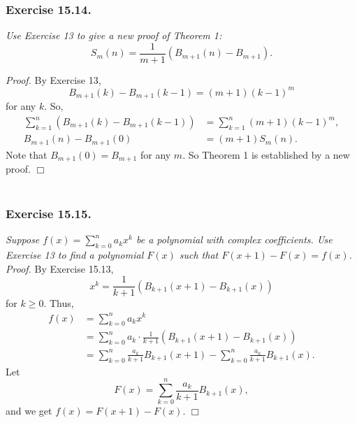\documentclass{article}
\begin{document}



\subsubsection*{Exercise 15.14.}
\emph{Use Exercise 13 to give a new proof of Theorem 1:
$$S_m(n) = \frac{1}{m+1}(B_{m+1}(n) - B_{m+1}).$$}

\emph{Proof.}
By Exercise 13,
$$B_{m+1}(k) - B_{m+1}(k-1) = (m+1)(k-1)^m$$
for any $k$.
So,
\begin{align*}
\sum_{k=1}^{n} (B_{m+1}(k) - B_{m+1}(k-1))
&= \sum_{k=1}^{n} (m+1)(k-1)^m, \\
B_{m+1}(n) - B_{m+1}(0)
&= (m+1)S_m(n).
\end{align*}
Note that $B_{m+1}(0) = B_{m+1}$ for any $m$.
So Theorem 1 is established by a new proof.
$\Box$ \\\\






\subsubsection*{Exercise 15.15.}
\emph{Suppose $f(x) = \sum_{k=0}^{n} a_k x^k$
be a polynomial with complex coefficients.
Use Exercise 13 to find a polynomial $F(x)$ such that
$F(x+1) - F(x) = f(x)$.} \\

\emph{Proof.}
By Exercise 15.13,
$$x^k = \frac{1}{k+1}(B_{k+1}(x+1) - B_{k+1}(x))$$
for $k \geq 0$.
Thus,
\begin{align*}
f(x)
&= \sum_{k=0}^{n} a_k x^k \\
&= \sum_{k=0}^{n} a_k \cdot \frac{1}{k+1} (B_{k+1}(x+1) - B_{k+1}(x)) \\
&= \sum_{k=0}^{n} \frac{a_k}{k+1} B_{k+1}(x+1) - \sum_{k=0}^{n} \frac{a_k}{k+1} B_{k+1}(x).
\end{align*}
Let
$$F(x) = \sum_{k=0}^{n} \frac{a_k}{k+1} B_{k+1}(x),$$
and we get $f(x) = F(x+1) - F(x)$.
$\Box$ \\\\
\end{document}
